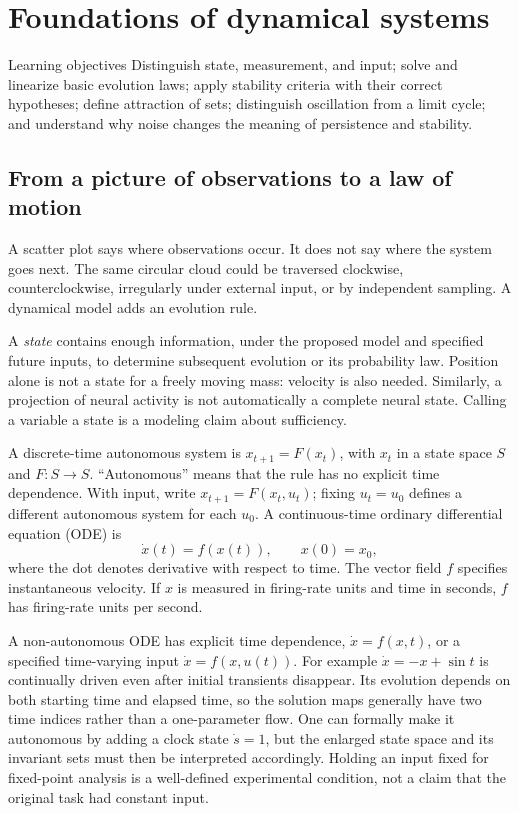 \chapter{Foundations of dynamical systems}\label{ch:02}
\begin{insight}{Learning objectives}
Distinguish state, measurement, and input; solve and linearize basic evolution laws; apply stability criteria with their correct hypotheses; define attraction of sets; distinguish oscillation from a limit cycle; and understand why noise changes the meaning of persistence and stability.
\end{insight}

\section{From a picture of observations to a law of motion}
A scatter plot says where observations occur. It does not say where the system goes next. The same circular cloud could be traversed clockwise, counterclockwise, irregularly under external input, or by independent sampling. A dynamical model adds an evolution rule.

A \emph{state} contains enough information, under the proposed model and specified future inputs, to determine subsequent evolution or its probability law. Position alone is not a state for a freely moving mass: velocity is also needed. Similarly, a projection of neural activity is not automatically a complete neural state. Calling a variable a state is a modeling claim about sufficiency.

A discrete-time autonomous system is $x_{t+1}=F(x_t)$, with $x_t$ in a state space $S$ and $F:S\to S$. ``Autonomous'' means that the rule has no explicit time dependence. With input, write $x_{t+1}=F(x_t,u_t)$; fixing $u_t=u_0$ defines a different autonomous system for each $u_0$. A continuous-time ordinary differential equation (ODE) is
\begin{equation}\label{eq:ode}
\dot x(t)=f(x(t)),\qquad x(0)=x_0,
\end{equation}
where the dot denotes derivative with respect to time. The vector field $f$ specifies instantaneous velocity. If $x$ is measured in firing-rate units and time in seconds, $f$ has firing-rate units per second.

A non-autonomous ODE has explicit time dependence, $\dot x=f(x,t)$, or a specified time-varying input $\dot x=f(x,u(t))$. For example $\dot x=-x+\sin t$ is continually driven even after initial transients disappear. Its evolution depends on both starting time and elapsed time, so the solution maps generally have two time indices rather than a one-parameter flow. One can formally make it autonomous by adding a clock state $\dot s=1$, but the enlarged state space and its invariant sets must then be interpreted accordingly. Holding an input fixed for fixed-point analysis is a well-defined experimental condition, not a claim that the original task had constant input.


